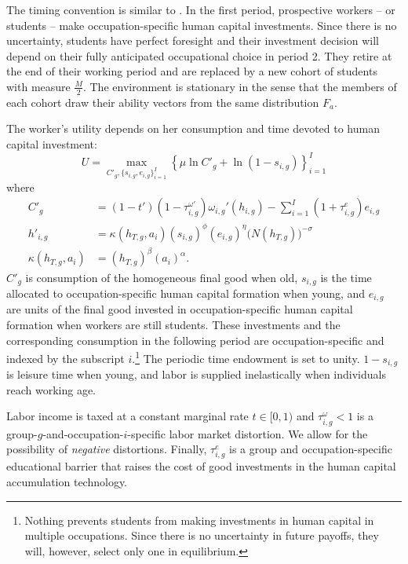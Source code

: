 \documentclass[onehalfspacing,11pt]{article}
\begin{document}
	The timing convention is similar to \cite{Hsieh:2019}. In the first period, prospective workers -- or students -- make occupation-specific human capital investments. Since there is no uncertainty, students have perfect foresight and their investment decision will depend on their fully anticipated occupational choice in period 2. They retire at the end of their working period and are replaced by a new cohort of students with measure $\tfrac{M}{2}$. The environment is stationary in the sense that the members of each cohort draw their ability vectors from the same distribution $F_a$.
	
	The worker's utility depends on her consumption and time devoted to human capital investment:
	\begin{equation}
		U = \max_{C'_{g},\{s_{i,g},e_{i,g}\}_{i=1}^I} \left\{\mu \ln C'_{g} + \ln\left(1-s_{i,g} \right) \label{eq:util} \right\}_{i=1}^I
	\end{equation}
	where
	\begin{align}
		\label{}
		C'_{g} & =(1-t')(1-\tau^{\omega '}_{i,g})\omega_{i,g}'(h_{i,g})- \sum_{i=1}^I(1+\tau^e_{i,g})e_{i,g} \label{eq:bc}\\ %
		h'_{i,g} & =\kappa(h_{T,g},a_i)(s_{i,g})^{\phi} (e_{i,g})^{\eta}\big(N(h_{T,g})\big)^{-\sigma} \label{eq:h}\\
		\kappa(h_{T,g},a_i) & =(h_{T,g})^\beta \left(a_i \right)^\alpha. \label{eq:g(h,a)}
	\end{align}
	$C'_{g}$ is consumption of the homogeneous final good when old, $s_{i,g}$ is the time allocated to occupation-specific human capital formation when young, and $e_{i,g}$ are units of the final good invested in occupation-specific human capital formation when workers are still students. These investments and the corresponding consumption in the following period are occupation-specific and indexed by the subscript $i$.\footnote{Nothing prevents students from making investments in human capital in multiple occupations. Since there is no uncertainty in future payoffs, they will, however, select only one in equilibrium.} The periodic time endowment is set to unity. $1-s_{i,g}$ is leisure time when young, and labor is supplied inelastically when individuals reach working age.
	
	Labor income is taxed at a constant marginal rate $t \in [0,1)$ and $\tau^\omega_{i,g} < 1$ is a group-$g$-and-occupation-$i$-specific labor market distortion. We allow for the possibility of {\it negative} distortions. Finally, $\tau^e_{i,g}$ is a group and occupation-specific educational barrier that raises the cost of good investments in the human capital accumulation technology.
	
\end{document}
